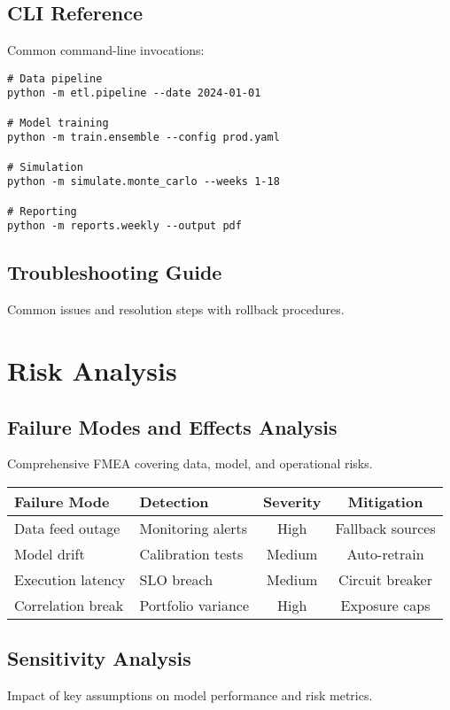 \section{CLI Reference}
Common command-line invocations:

\begin{verbatim}
# Data pipeline
python -m etl.pipeline --date 2024-01-01

# Model training
python -m train.ensemble --config prod.yaml

# Simulation
python -m simulate.monte_carlo --weeks 1-18

# Reporting
python -m reports.weekly --output pdf
\end{verbatim}

\section{Troubleshooting Guide}
Common issues and resolution steps with rollback procedures.

\chapter{Risk Analysis}

\section{Failure Modes and Effects Analysis}
Comprehensive FMEA covering data, model, and operational risks.

\begin{table}[h]
\centering
\begin{tabular}{llcc}
\toprule
\textbf{Failure Mode} & \textbf{Detection} & \textbf{Severity} & \textbf{Mitigation} \\
\midrule
Data feed outage & Monitoring alerts & High & Fallback sources \\
Model drift & Calibration tests & Medium & Auto-retrain \\
Execution latency & SLO breach & Medium & Circuit breaker \\
Correlation break & Portfolio variance & High & Exposure caps \\
\bottomrule
\end{tabular}
\end{table}

\section{Sensitivity Analysis}
Impact of key assumptions on model performance and risk metrics.

